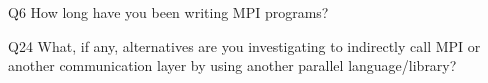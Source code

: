 \begin{description}%
\item{Q6} How long have you been writing MPI programs?%
\item{Q24} What, if any, alternatives are you investigating to indirectly call MPI or another communication layer by using another parallel language/library?%
\end{description}%
